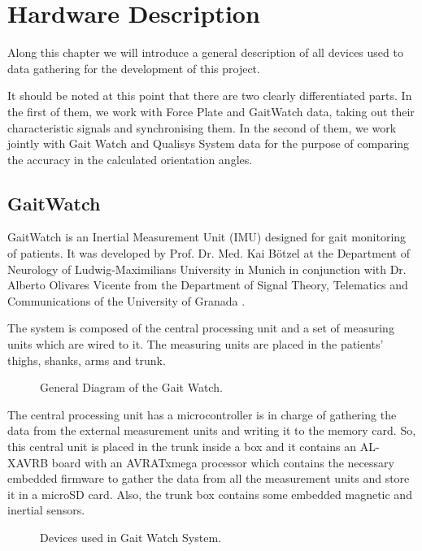\chapter{Hardware Description}
\label{ch:Hardware}
Along this chapter we will introduce a general description of all devices used to data gathering for the development of this project.


It should be noted at this point that there are two clearly differentiated parts. In the first of them, we work with Force Plate and GaitWatch data, taking out their characteristic signals and synchronising them. In the second of them, we work jointly with Gait Watch and Qualisys System data for the purpose of comparing the accuracy in the calculated orientation angles.


\section{GaitWatch}

GaitWatch is an Inertial Measurement Unit (IMU) designed for gait monitoring of patients. It was developed by Prof. Dr. Med. Kai Bötzel at the Department of Neurology of Ludwig-Maximilians University in Munich in conjunction with Dr. Alberto Olivares Vicente from the Department of Signal Theory, Telematics and Communications of the University of Granada \cite{OlivaresBotzel2013}.

The system is composed of the central processing unit and
a set of measuring units which are wired to it. The measuring units are 
placed in the patients’ thighs, shanks, arms and trunk.

\begin{figure}[H]
	\centering
	\caption{General Diagram of the Gait Watch.}
	\label{fig:diagram}
\end{figure}

The central processing unit has a microcontroller is in charge of gathering the data from the external measurement units and writing it to the memory card. So, this central unit is placed in the trunk inside a box and it contains an AL-XAVRB board with an AVRATxmega processor which contains the necessary embedded firmware to gather the data from all the measurement units and store it in a microSD card. Also, the trunk box contains some embedded magnetic and inertial sensors.

\begin{figure}[H]
	\centering
	\caption{Devices used in Gait Watch System.}
	\label{fig:devicesGW}
\end{figure}

